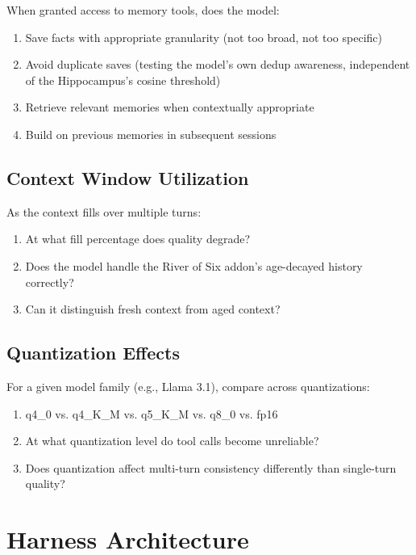 \documentclass[man,12pt,floatsintext]{apa7}
\begin{document}
When granted access to memory tools, does the model:

\begin{enumerate}
  \item Save facts with appropriate granularity (not too broad, not too specific)
  \item Avoid duplicate saves (testing the model's own dedup awareness, independent of
        the Hippocampus's cosine threshold)
  \item Retrieve relevant memories when contextually appropriate
  \item Build on previous memories in subsequent sessions
\end{enumerate}

\subsection{Context Window Utilization}

As the context fills over multiple turns:

\begin{enumerate}
  \item At what fill percentage does quality degrade?
  \item Does the model handle the River of Six addon's age-decayed history correctly?
  \item Can it distinguish fresh context from aged context?
\end{enumerate}

\subsection{Quantization Effects}

For a given model family (e.g., Llama 3.1), compare across quantizations:

\begin{enumerate}
  \item q4\_0 vs. q4\_K\_M vs. q5\_K\_M vs. q8\_0 vs. fp16
  \item At what quantization level do tool calls become unreliable?
  \item Does quantization affect multi-turn consistency differently than single-turn quality?
\end{enumerate}

\section{Harness Architecture}
\end{document}
